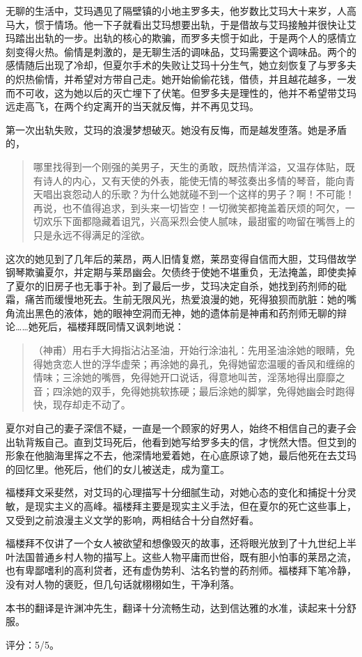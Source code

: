 无聊的生活中，艾玛遇见了隔壁镇的小地主罗多夫，他岁数比艾玛大十来岁，人高马大，惯于情场。他一下子就看出艾玛想要出轨，于是借故与艾玛接触并很快让艾玛踏出出轨的一步。出轨的核心的欺骗，而罗多夫惯于如此，于是两个人的感情立刻变得火热。偷情是刺激的，是无聊生活的调味品，艾玛需要这个调味品。两个的感情随后出现了冷却，但夏尔手术的失败让艾玛十分生气，她立刻恢复了与罗多夫的炽热偷情，并希望对方带自己走。她开始偷偷花钱，借债，并且越花越多，一发而不可收，这为她以后的灭亡埋下了伏笔。但罗多夫是理性的，他并不希望带艾玛远走高飞，在两个约定离开的当天就反悔，并不再见艾玛。

第一次出轨失败，艾玛的浪漫梦想破灭。她没有反悔，而是越发堕落。她是矛盾的，
\begin{quotation}
哪里找得到一个刚强的美男子，天生的勇敢，既热情洋溢，又温存体贴，既有诗人的内心，又有天使的外表，能使无情的琴弦奏出多情的琴音，能向青天唱出哀怨动人的乐歌？为什么她就碰不到一个这样的男子？啊！不可能！再说，也不值得追求，到头来一切皆空！一切微笑都掩盖着厌烦的呵欠，一切欢乐下面都隐藏着诅咒，兴高采烈会使人腻味，最甜蜜的吻留在嘴唇上的只是永远不得满足的淫欲。
\end{quotation}

这次的她见到了几年后的莱昂，两人旧情复燃，莱昂变得自信而大胆，艾玛借故学钢琴欺骗夏尔，并定期与莱昂幽会。欠债终于使她不堪重负，无法掩盖，即使卖掉了夏尔的旧房子也无事于补。到了最后一步，艾玛决定自杀，她找到药剂师的砒霜，痛苦而缓慢地死去。生前无限风光，热爱浪漫的她，死得狼狈而肮脏：她的嘴角流出黑色的液体，她的眼神空洞而无神，她的遗体前是神甫和药剂师无聊的辩论……她死后，福楼拜既同情又讽刺地说：
\begin{quotation}
（神甫）用右手大拇指沾沾圣油，开始行涂油礼：先用圣油涂她的眼睛，免得她贪恋人世的浮华虚荣；再涂她的鼻孔，免得她留恋温暖的香风和缠绵的情味；三涂她的嘴唇，免得她开口说话，得意地叫苦，淫荡地得出靡靡之音；四涂她的双手，免得她挑软拣硬；最后涂她的脚掌，免得她幽会时跑得快，现存却走不动了。
\end{quotation}

夏尔对自己的妻子深信不疑，一直是一个顾家的好男人，始终不相信自己的妻子会出轨背叛自己。直到艾玛死后，他看到她写给罗多夫的信，才恍然大悟。但艾到的形象在他脑海里挥之不去，他深情地爱着她，在心底原谅了她，最后他死在去艾玛的回忆里。他死后，他们的女儿被送走，成为童工。

福楼拜文采斐然，对艾玛的心理描写十分细腻生动，对她心态的变化和捕捉十分灵敏，是现实主义的高峰。福楼拜主要是现实主义手法，但在夏尔的死亡这些事上，又受到之前浪漫主义文学的影响，两相结合十分自然好看。

福楼拜不仅讲了一个女人被欲望和想像毁灭的故事，还将眼光放到了十九世纪上半叶法国普通乡村人物的描写上。这些人物平庸而世俗，既有胆小怕事的莱昂之流，也有卑鄙嗜利的高利贷者，还有虚伪势利、沽名钓誉的药剂师。福楼拜下笔冷静，没有对人物的褒贬，但几句话就栩栩如生，干净利落。

本书的翻译是许渊冲先生，翻译十分流畅生动，达到信达雅的水准，读起来十分舒服。

评分：5/5。